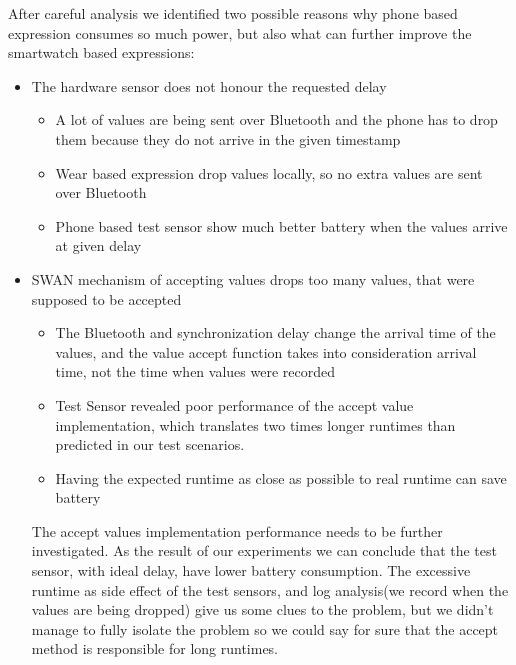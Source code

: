 After careful analysis we identified two possible reasons why phone based expression consumes so much power, but also what can further improve the smartwatch based expressions:
\begin{itemize}
 \item The hardware sensor does not honour the requested delay
 \begin{itemize}
  \item A lot of values are being sent over Bluetooth and the phone has to drop them because they do not arrive in the given timestamp
  \item Wear based expression drop values locally, so no extra values are sent over Bluetooth
  \item Phone based test sensor show much better battery when the values arrive at given delay
 \end{itemize}
 \item SWAN mechanism of accepting values drops too many values, that were supposed to be accepted
 \begin{itemize}
  \item The Bluetooth and synchronization delay change the arrival time of the values, and the value accept function takes into consideration arrival time, not the time when values were recorded
  \item Test Sensor revealed poor performance of the accept value implementation, which translates two times longer runtimes than predicted in our test scenarios.
  \item Having the expected runtime as close as possible to real runtime can save battery
 \end{itemize}

 The accept values implementation performance needs to be further investigated.
 As the result of our experiments we can conclude that the test sensor, with ideal delay, have lower battery consumption.
 The excessive runtime as side effect of the test sensors, and log analysis(we record when the values are being dropped) give us some clues to the problem, but we didn't manage to fully isolate the
 problem so we could say for sure that the accept method is responsible for long runtimes.

\end{itemize}
